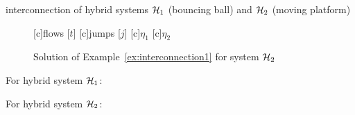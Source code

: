 \begin{example}{interconnection of hybrid systems $\mathcal{H}_1$ (bouncing ball) and $\mathcal{H}_2$ (moving platform)}
\begin{figure}[ht]
  \centering
  [c]{flows [$t$]}
  [c]{jumps [$j$]}
  [c]{$\eta_1$}
  [c]{$\eta_2$}
\qquad
{}
\caption{Solution of Example~\ref{ex:interconnection1} for system $\mathcal{H}_2$}
\end{figure}

For hybrid system $\mathcal{H}_1$:

\label{scr:f}

\label{scr:C}

\label{scr:g}

\label{scr:D}

For hybrid system $\mathcal{H}_2$:

\label{scr:f2}

\label{scr:C2}

\label{scr:g2}

\label{scr:D2}


\end{example}
